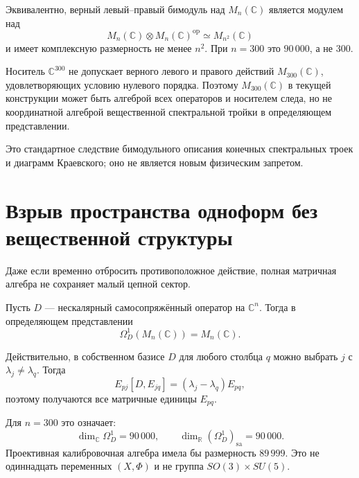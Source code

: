Эквивалентно, верный левый--правый бимодуль над
$M_n(\mathbb C)$ является модулем над
\begin{equation}
 M_n(\mathbb C)\otimes M_n(\mathbb C)^{\mathrm{op}}
 \simeq M_{n^2}(\mathbb C)
\end{equation}
и имеет комплексную размерность не менее $n^2$. При $n=300$ это
$90\,000$, а не 300.

\begin{theorem}
Носитель $\mathbb C^{300}$ не допускает верного левого и правого действий
$M_{300}(\mathbb C)$, удовлетворяющих условию нулевого порядка. Поэтому
$M_{300}(\mathbb C)$ в текущей конструкции может быть алгеброй всех
операторов и носителем следа, но не координатной алгеброй вещественной
спектральной тройки в определяющем представлении.
\end{theorem}

Это стандартное следствие бимодульного описания конечных спектральных
троек и диаграмм Краевского; оно не является новым физическим запретом.

\section{Взрыв пространства одноформ без вещественной структуры}

Даже если временно отбросить противоположное действие, полная матричная
алгебра не сохраняет малый цепной сектор.

\begin{proposition}
Пусть $D$ --- нескалярный самосопряжённый оператор на $\mathbb C^n$.
Тогда в определяющем представлении
\begin{equation}
 \Omega_D^1(M_n(\mathbb C))=M_n(\mathbb C).
\end{equation}
\end{proposition}

Действительно, в собственном базисе $D$ для любого столбца $q$ можно
выбрать $j$ с $\lambda_j\ne\lambda_q$. Тогда
\begin{equation}
 E_{pj}[D,E_{jq}]
 =(\lambda_j-\lambda_q)E_{pq},
\end{equation}
поэтому получаются все матричные единицы $E_{pq}$.

Для $n=300$ это означает:
\begin{equation}
 \dim_{\mathbb C}\Omega_D^1=90\,000,
 \qquad
 \dim_{\mathbb R}(\Omega_D^1)_{\mathrm{sa}}=90\,000.
\end{equation}
Проективная калибровочная алгебра имела бы размерность $89\,999$.
Это не одиннадцать переменных $(X,\Phi)$ и не группа
$SO(3)\times SU(5)$.

